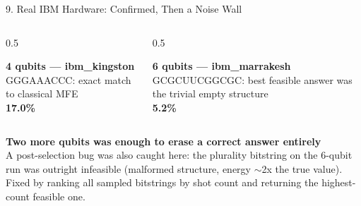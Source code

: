 \documentclass[aspectratio=169,10pt]{beamer}
\begin{document}
\begin{frame}{9. Real IBM Hardware: Confirmed, Then a Noise Wall}
  \begin{columns}[T]
    \begin{column}{0.5\textwidth}
      \begin{navybox}
      \textbf{\color{accent}4 qubits --- ibm\_kingston}\\[3pt]
      \footnotesize GGGAAACCC: exact match to classical MFE\\[6pt]
      {\Large\textbf{17.0\%}} 
      \end{navybox}
    \end{column}
    \begin{column}{0.5\textwidth}
      \begin{redbox}
      \textbf{6 qubits --- ibm\_marrakesh}\\[3pt]
      \footnotesize GCGCUUCGGCGC: best feasible answer was the trivial empty structure\\[6pt]
      {\Large\textbf{5.2\%}} 
      \end{redbox}
    \end{column}
  \end{columns}
  \vspace{8pt}
  \begin{cardbox}
  \textbf{\color{navy}Two more qubits was enough to erase a correct answer entirely}\\[4pt]
  \footnotesize A post-selection bug was also caught here: the plurality bitstring on the 6-qubit run was outright infeasible (malformed structure, energy $\sim$2x the true value). Fixed by ranking all sampled bitstrings by shot count and returning the highest-count feasible one.
  \end{cardbox}
\end{frame}
\end{document}
